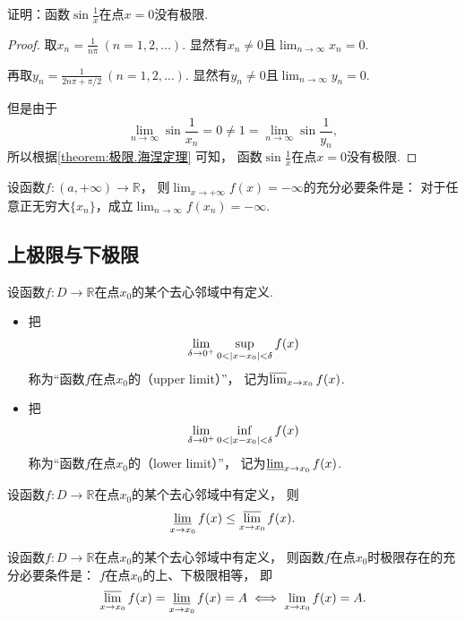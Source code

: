 \begin{example}
证明：函数\(\sin\frac1x\)在点\(x=0\)没有极限.
\begin{proof}
取\(x_n = \frac1{n\pi}\ (n=1,2,\dotsc)\).
显然有\(x_n\neq0\)且\(\lim_{n\to\infty} x_n = 0\).

再取\(y_n = \frac1{2n\pi+\pi/2}\ (n=1,2,\dotsc)\).
显然有\(y_n\neq0\)且\(\lim_{n\to\infty} y_n = 0\).

但是由于\[
	\lim_{n\to\infty} \sin\frac1{x_n} = 0
	\neq 1 = \lim_{n\to\infty} \sin\frac1{y_n},
\]
所以根据\cref{theorem:极限.海涅定理} 可知，
函数\(\sin\frac1x\)在点\(x=0\)没有极限.
\end{proof}
\end{example}

\begin{theorem}
设函数\(f\colon (a,+\infty)\to\mathbb{R}\)，
则\(\lim_{x\to+\infty} f(x) = -\infty\)的充分必要条件是：
对于任意正无穷大\(\{x_n\}\)，成立\(\lim_{n\to\infty} f(x_n) = -\infty\).
\end{theorem}

\subsection{上极限与下极限}
\begin{definition}
设函数\(f\colon D\to\mathbb{R}\)在点\(x_0\)的某个去心邻域中有定义.
\begin{itemize}
	\item 把\[
		\lim_{\delta\to0^+} \sup_{0<\abs{x-x_0}<\delta} f(x)
	\]称为“函数\(f\)在点\(x_0\)的（upper limit）”，
	记为\(\varlimsup_{x \to x_0} f(x)\).

	\item 把\[
		\lim_{\delta\to0^+} \inf_{0<\abs{x-x_0}<\delta} f(x)
	\]称为“函数\(f\)在点\(x_0\)的（lower limit）”，
	记为\(\varliminf_{x \to x_0} f(x)\).
\end{itemize}
\end{definition}

\begin{property}
设函数\(f\colon D\to\mathbb{R}\)在点\(x_0\)的某个去心邻域中有定义，
则\[
	\varliminf_{x \to x_0} f(x) \leq \varlimsup_{x \to x_0} f(x).
\]
\end{property}

\begin{theorem}
设函数\(f\colon D\to\mathbb{R}\)在点\(x_0\)的某个去心邻域中有定义，
则函数\(f\)在点\(x_0\)时极限存在的充分必要条件是：
\(f\)在点\(x_0\)的上、下极限相等，
即\[
	\varlimsup_{x \to x_0} f(x)
	= \varliminf_{x \to x_0} f(x)
	= A
	\iff
	\lim_{x \to x_0} f(x) = A.
\]
\end{theorem}
